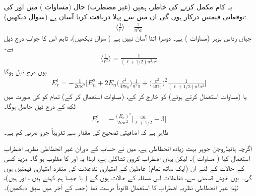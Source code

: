  یہ کام مکمل کرنے کی خاطر، ہمیں (غیر مضطرب) حال  (مساوات ) میں  اور  کی توقعاتی قیمتیں درکار ہوں گی۔ان میں سے پہلا دریافت کرنا آسان ہے (سوال  دیکھیں):
\begin{align}\label{مساوات_غیر_مضطرب_آر_ایک}
\big\langle \frac{1}{r} \big\rangle = \frac{1}{n^2 a}
\end{align}
جہاں  رداس بوہر (مساوات ) ہے۔ دوسرا اتنا آسان نہیں ہے ( سوال  دیکھیں)، تاہم اس کا جواب درج ذیل ہے۔
\begin{align}\label{مساوات_غیر_مضطرب_آر_دوم}
\big\langle \frac{1}{r^2} \big\rangle = \frac{1}{(\ell + 1/2)n^3 a^2}
\end{align}
یوں درج ذیل ہوگا 
\begin{align*}
E_r^1 = - \frac{1}{2mc^2} \big [ E_n^2 + 2 E_n \big(\frac{e^2}{4 \pi \epsilon_0}\big) \frac{1}{n^2 a} + \big(\frac{e^2}{4 \pi \epsilon_0}\big)^2 \frac{1}{(\ell + 1/2)n^3 a^2} \big ]
\end{align*}
یا (مساوات  استعمال کرتے ہوئے)  کو خارج کر کے، (مساوات  استعمال کر کے) تمام کو  کی صورت میں لکھ کے درج ذیل حاصل ہوگا۔
\begin{align}\label{مساوات_غیر_مضطرب_اضافیتی_تصحیح}
E_r^1 = - \frac{(E_n)^2}{2mc^2} \big [ \frac{4n}{\ell + 1/2} - 3 \big ]
\end{align}
ظاہر ہے کہ اضافیتی تصحیح کی مقدار  سے تقریباً جزو ضربی کم ہے۔

اگرچہ ہائیڈروجن جوہر بہت زیادہ انحطاطی ہے، میں نے حساب کے دوران غیر انحطاطی نظریہ اضطراب استعمال کیا ( مساوات )۔ لیکن یہاں اضطراب کروی تشاکلی ہے، لہٰذا یہ  اور  کا مقلوب ہو گا۔ مزید کسی  کے  حالات کے لئے ان (ایک ساتھ تمام) عاملین کے امتیازی تفاعلات کی منفرد امتیازی  قیمتیں  ہوں گی۔ یوں خوش قسمتی سے، تفاعلات  اس مسئلہ کے حالات ہوں گے ( یا جیسا ہم کہتے ہیں ،  اور   ہیں)، لہٰذا غیر انحطاطی نظریہ اضطراب کا استعمال قانوناً درست تھا (حصہ  کے آخر میں سبق دیکھیں)۔

